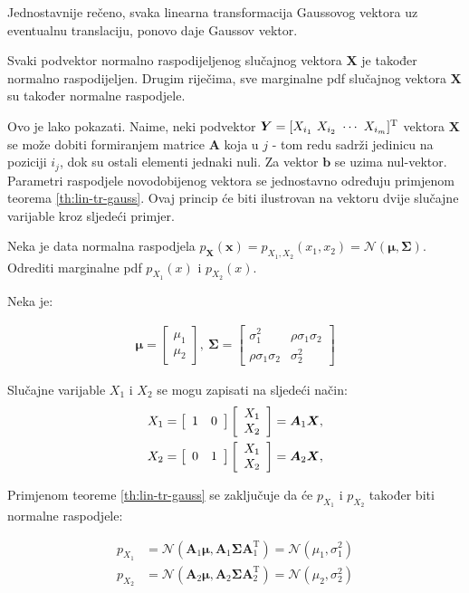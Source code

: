 Jednostavnije rečeno, svaka linearna transformacija Gaussovog vektora uz
eventualnu translaciju, ponovo daje Gaussov vektor.

\begin{corollary}
	Svaki podvektor normalno raspodijeljenog slučajnog vektora $\bm X$ je također
	normalno raspodijeljen. Drugim riječima, sve marginalne pdf slučajnog
	vektora $\bm X$ su također normalne raspodjele.
\end{corollary}

Ovo je lako pokazati. Naime, neki podvektor $\bm Y = [X_{i_1}\ X_{i_2}\ \cdots\
X_{i_m}]^\text T$ vektora $\bm X$ se može dobiti formiranjem matrice $\bm A$
koja u $j$ - tom redu sadrži jedinicu na poziciji $i_j$, dok su ostali elementi
jednaki nuli. Za vektor $\bm b$ se uzima nul-vektor.  Parametri raspodjele
novodobijenog vektora se jednostavno određuju primjenom teorema
\ref{th:lin-tr-gauss}. Ovaj princip će biti ilustrovan na vektoru dvije slučajne
varijable kroz sljedeći primjer.

\begin{exmp}
	Neka je data normalna raspodjela $p_{\bm X}(\bm x) = p_{X_1,X_2}(x_1, x_2) =
	\mathcal{N}(\bm\mu, \bm \Sigma)$. Odrediti marginalne pdf $p_{X_1}(x)$ i
	$p_{X_2}(x)$.
\end{exmp}

Neka je:

\begin{eqnarray} \label{eq:kovarijansa-2d}
	\bm\mu = \left[\begin{array}{c}
		\mu_1 \\ \mu_2
	\end{array}\right],\ 
	\bm\Sigma = \left[\begin{array}{cc}
	  \sigma_1^2 & \rho\sigma_1\sigma_2 \\  \rho\sigma_1\sigma_2 & \sigma_2^2
	\end{array}\right]
\end{eqnarray}

Slučajne varijable $X_1$ i $X_2$ se mogu zapisati na sljedeći način:
\begin{eqnarray}
	X_1 = \left[\begin{array}{cc}1&0\end{array}\right] \left[\begin{array}{c}X_1\\X_2\end{array}\right] = \bm A_1 \bm X,
	\\
	X_2 = \left[\begin{array}{cc}0&1\end{array}\right] \left[\begin{array}{c}X_1\\X_2\end{array}\right] = \bm A_2 \bm X,
\end{eqnarray}

Primjenom teoreme \ref{th:lin-tr-gauss} se zaključuje da će $p_{X_1}$ i
$p_{X_2}$ također biti normalne raspodjele:

\begin{align*}
	p_{X_1} &= \mathcal{N}(\bm A_1\bm\mu, \bm A_1 \bm\Sigma \bm A_1^\mathrm T)
		= \mathcal{N}(\mu_1, \sigma_1^2) \\
	p_{X_2} &= \mathcal{N}(\bm A_2\bm\mu, \bm A_2 \bm\Sigma \bm A_2^\mathrm T)
		= \mathcal{N}(\mu_2, \sigma_2^2)
\end{align*}

